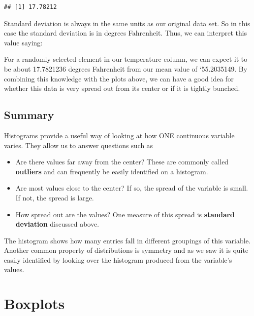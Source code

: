 \documentclass[]{tufte-book}
\newenvironment{Shaded}{\begin{snugshade}}{\end{snugshade}}
\newcommand{\KeywordTok}[1]{\textcolor[rgb]{0.13,0.29,0.53}{\textbf{{#1}}}}
\newcommand{\DataTypeTok}[1]{\textcolor[rgb]{0.13,0.29,0.53}{{#1}}}
\newcommand{\OtherTok}[1]{\textcolor[rgb]{0.56,0.35,0.01}{{#1}}}
\newcommand{\NormalTok}[1]{{#1}}
\providecommand{\tightlist}{%
  \setlength{\itemsep}{0pt}\setlength{\parskip}{0pt}}
\begin{document}
\begin{Shaded}
\end{Shaded}

\begin{verbatim}
## [1] 17.78212
\end{verbatim}

Standard deviation is always in the same units as our original data set.
So in this case the standard deviation is in degrees Fahrenheit. Thus,
we can interpret this value saying:

For a randomly selected element in our temperature column, we can expect
it to be about 17.7821236 degrees Fahrenheit from our mean value of
`55.2035149. By combining this knowledge with the plots above, we can
have a good idea for whether this data is very spread out from its
center or if it is tightly bunched.

\subsection{Summary}\label{summary}

Histograms provide a useful way of looking at how ONE continuous
variable varies. They allow us to answer questions such as

\begin{itemize}
\tightlist
\item
  Are there values far away from the center? These are commonly called
  \textbf{outliers} and can frequently be easily identified on a
  histogram.
\item
  Are most values close to the center? If so, the spread of the variable
  is small. If not, the spread is large.
\item
  How spread out are the values? One measure of this spread is
  \textbf{standard deviation} discussed above.
\end{itemize}

The histogram shows how many entries fall in different groupings of this
variable. Another common property of distributions is symmetry and as we
saw it is quite easily identified by looking over the histogram produced
from the variable's values.

\section{Boxplots}\label{boxplots}
\end{document}
